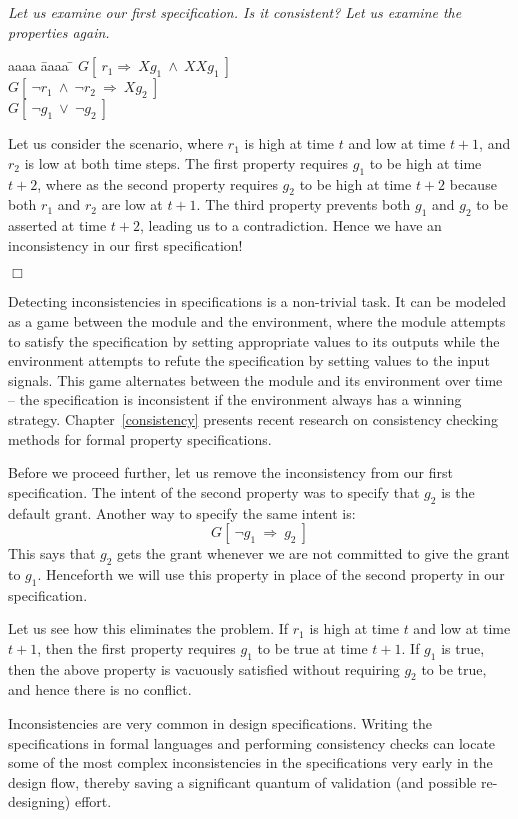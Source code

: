 \begin{example} \label{ex3}
{\em 
Let us examine our first specification. {\em Is it consistent?} Let us examine
the properties again.
\begin{tabbing}
aaaa \= aaaa \= \kill
\> $G[\ r_1 \Rightarrow\  Xg_1\ \land\  XXg_1\ ]$ \\
\> $G[\ \neg r_1\ \land\ \neg r_2\ \Rightarrow\  Xg_2\ ]$ \\
\> $G[\ \neg g_1\ \lor\ \neg g_2\ ]$
\end{tabbing}
Let us consider the scenario, where $r_1$ is high at time $t$ and low at time
$t+1$, and $r_2$ is low at both time steps. The first property requires 
$g_1$ to be high at time $t+2$, where as the second property requires
$g_2$ to be high at time $t+2$ because both $r_1$ and $r_2$ are low at
$t+1$. The third property prevents both $g_1$ and $g_2$ to be asserted at
time $t+2$, leading us to a contradiction. Hence we have an inconsistency
in our first specification!
} $\Box$
\end{example}

Detecting inconsistencies in specifications is a non-trivial task. It can
be modeled as a game between the module and the environment, where the 
module attempts to satisfy the specification by setting appropriate values
to its outputs while the environment attempts to refute the specification
by setting values to the input signals. This game alternates between the
module and its environment over time -- the specification is inconsistent
if the environment always has a winning strategy. Chapter~\ref{consistency}
presents recent research on consistency checking methods for formal property
specifications.

Before we proceed further, let us remove the inconsistency from our first
specification. The intent of the second property was to specify that $g_2$
is the default grant. Another way to specify the same intent is:
\[ G[\ \neg g_1\ \Rightarrow\  g_2\ ] \]
This says that $g_2$ gets the grant whenever we are not committed to give the
grant to $g_1$. Henceforth we will use this property in place of the second
property in our specification.

Let us see how this eliminates the problem. If $r_1$ is high at time $t$ and
low at time $t+1$, then the first property requires $g_1$ to be true at time 
$t+1$. If $g_1$ is true, then the above property is vacuously satisfied
without requiring $g_2$ to be true, and hence there is no conflict.

Inconsistencies are very common in design specifications. Writing the
specifications in formal languages and performing consistency checks can
locate some of the most complex inconsistencies in the specifications
very early in the design flow, thereby saving a significant quantum of
validation (and possible re-designing) effort.

